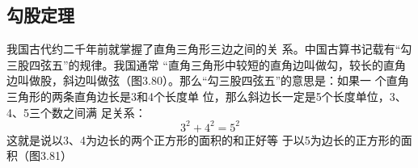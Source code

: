 \begin{solution}
    
\end{solution}





\subsection{勾股定理}

我国古代约二千年前就掌握了直角三角形三边之间的关
系。中国古算书记载有“勾三股四弦五”的规律。我国通常
“直角三角形中较短的直角边叫做勾，较长的直角边叫做股，斜边叫做弦（图3.80）。那么“勾三股四弦五”的意思是：如果一
个直角三角形的两条直角边长是3和4个长度单
位，那么斜边长一定是5个长度单位，3、4、5三个数之间满
足关系：
\[3^2+4^2=5^2\]
这就是说以3、4为边长的两个正方形的面积的和正好等
于以5为边长的正方形的面积（图3.81）
















